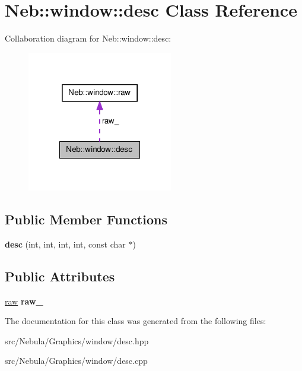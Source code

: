 \hypertarget{classNeb_1_1window_1_1desc}{\section{\-Neb\-:\-:window\-:\-:desc \-Class \-Reference}
\label{classNeb_1_1window_1_1desc}
}


\-Collaboration diagram for \-Neb\-:\-:window\-:\-:desc\-:\nopagebreak
\begin{figure}[H]
\begin{center}
\leavevmode
\includegraphics[width=180pt]{classNeb_1_1window_1_1desc__coll__graph}
\end{center}
\end{figure}
\subsection*{\-Public \-Member \-Functions}
\begin{DoxyCompactItemize}
\item 
\hypertarget{classNeb_1_1window_1_1desc_af2517ebee977a7d5c2878cb4d8c35911}{{\bfseries desc} (int, int, int, int, const char $\ast$)}\label{classNeb_1_1window_1_1desc_af2517ebee977a7d5c2878cb4d8c35911}

\end{DoxyCompactItemize}
\subsection*{\-Public \-Attributes}
\begin{DoxyCompactItemize}
\item 
\hypertarget{classNeb_1_1window_1_1desc_a5261a160f4d84f35241fcd6b5d1540e7}{\hyperlink{structNeb_1_1window_1_1raw}{raw} {\bfseries raw\-\_\-}}\label{classNeb_1_1window_1_1desc_a5261a160f4d84f35241fcd6b5d1540e7}

\end{DoxyCompactItemize}


\-The documentation for this class was generated from the following files\-:\begin{DoxyCompactItemize}
\item 
src/\-Nebula/\-Graphics/window/desc.\-hpp\item 
src/\-Nebula/\-Graphics/window/desc.\-cpp\end{DoxyCompactItemize}
